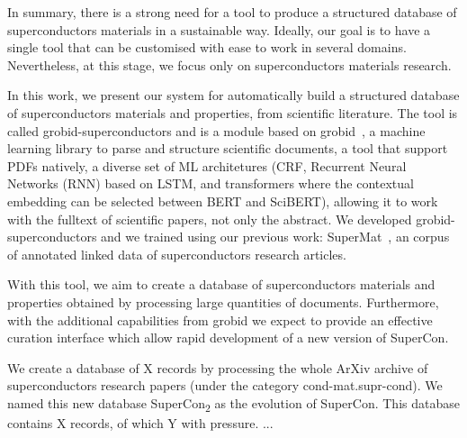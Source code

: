 \documentclass{article}
\begin{document}
In summary, there is a strong need for a tool to produce a structured database of superconductors materials in a sustainable way. 
Ideally, our goal is to have a single tool that can be customised with ease to work in several domains. Nevertheless, at this stage, we focus only on superconductors materials research. 

In this work, we present our system for automatically build a structured database of superconductors materials and properties, from scientific literature. The tool is called grobid-superconductors and is a module based on grobid~\cite{GROBID}, a machine learning library to parse and structure scientific documents, a tool that support PDFs natively, a diverse set of ML architetures (CRF, Recurrent Neural Networks (RNN) based on LSTM, and transformers where the contextual embedding can be selected between BERT and SciBERT), allowing it to work with the fulltext of scientific papers, not only the abstract.
We developed grobid-superconductors and we trained using our previous work: SuperMat~\cite{foppiano2020supermat}, an corpus of annotated linked data of superconductors research articles.


With this tool, we aim to create a database of superconductors materials and properties obtained by processing large quantities of documents. Furthermore, with the additional capabilities from grobid we expect to provide an effective curation interface which allow rapid development of a new version of SuperCon. 


We create a database of X records by processing the whole ArXiv archive of superconductors research papers (under the category cond-mat.supr-cond). 
We named this new database  SuperCon\textsubscript{2} as the evolution of SuperCon. 
This database contains X records, of which Y with pressure. ...


\end{document}
